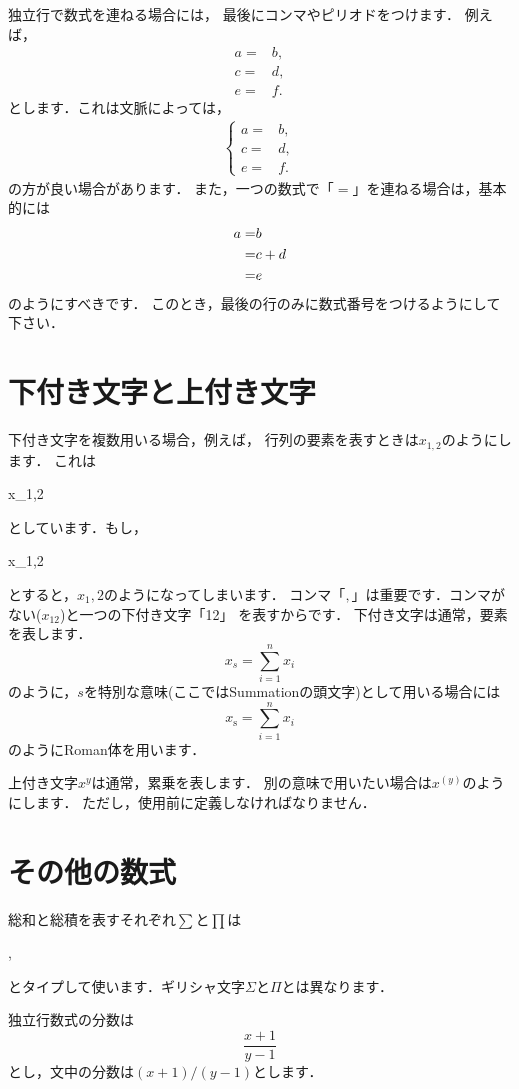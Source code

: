 \documentclass[a4j,12pt,dvipdfmx,oneside]{jsbook}
\theoremstyle{definition}
\begin{document}
独立行で数式を連ねる場合には，
最後にコンマやピリオドをつけます．
例えば，
\begin{align}
a=&b,\\
c=&d,\\
e=&f.
\end{align}
とします．これは文脈によっては，
\begin{align}
\begin{cases}
a=&b,\\
c=&d,\\
e=&f.
\end{cases}
\end{align}
の方が良い場合があります．
また，一つの数式で「$=$」を連ねる場合は，基本的には
\begin{align}
a=&b\notag\\
=&c+d\notag\\
=&e
\end{align}
のようにすべきです．
このとき，最後の行のみに数式番号をつけるようにして下さい．
%
%
%
\section{下付き文字と上付き文字}\label{sec:math_script}
%
%
%
下付き文字を複数用いる場合，例えば，
行列の要素を表すときは$x_{1,2}$のようにします．
これは
\begin{verbatimtab}
x_{1,2}
\end{verbatimtab}
としています．もし，
\begin{verbatimtab}
x_1,2
\end{verbatimtab}
とすると，$x_1,2$のようになってしまいます．
コンマ「$,$」は重要です．コンマがない($x_{12}$)と一つの下付き文字「12」
を表すからです．
下付き文字は通常，要素を表します．
$$
x_s=\sum_{i=1}^nx_i
$$
のように，$s$を特別な意味(ここではSummationの頭文字)として用いる場合には
$$
x_{\text{s}}=\sum_{i=1}^nx_i
$$
のようにRoman体を用います．

上付き文字$x^y$は通常，累乗を表します．
別の意味で用いたい場合は$x^{(y)}$のようにします．
ただし，使用前に定義しなければなりません．
%
%
%
\section{その他の数式}\label{sec:math_misc}
%
%
%
総和と総積を表すそれぞれ$\sum$と$\prod$は
\begin{verbatimtab}
\sum, \prod
\end{verbatimtab}
とタイプして使います．ギリシャ文字$\Sigma$と$\Pi$とは異なります．

独立行数式の分数は
$$
\frac{x+1}{y-1}
$$
とし，文中の分数は$(x+1)/(y-1)$とします．
\end{document}

